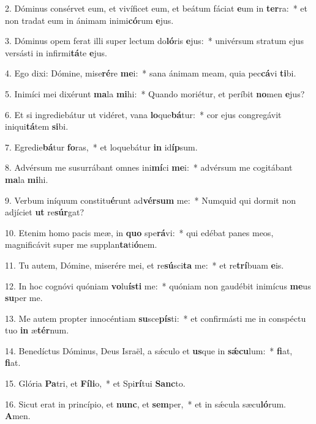 2. Dóminus consérvet eum, et vivíficet eum, et beátum fáciat \textbf{e}um in \textbf{ter}ra:~*  et non tradat eum in ánimam inimi\textbf{có}rum \textbf{e}jus.\

3. Dóminus opem ferat illi super lectum do\textbf{ló}ris \textbf{e}jus:~*  univérsum stratum ejus versásti in infirmi\textbf{tá}te \textbf{e}jus.\

4. Ego dixi: Dómine, mise\textbf{ré}re \textbf{me}i:~*  sana ánimam meam, quia pec\textbf{cá}vi \textbf{ti}bi.\

5. Inimíci mei dixérunt \textbf{ma}la \textbf{mi}hi:~*  Quando moriétur, et períbit \textbf{no}men \textbf{e}jus?\

6. Et si ingrediebátur ut vidéret, vana \textbf{lo}que\textbf{bá}tur:~*  cor ejus congregávit iniqui\textbf{tá}tem \textbf{si}bi.\

7. Egredie\textbf{bá}tur \textbf{fo}ras,~*  et loquebátur \textbf{in} id\textbf{íp}sum.\

8. Advérsum me susurrábant omnes ini\textbf{mí}ci \textbf{me}i:~*  advérsum me cogitábant \textbf{ma}la \textbf{mi}hi.\

9. Verbum iníquum constitu\textbf{é}runt ad\textbf{vér}\textbf{sum} me:~*  Numquid qui dormit non adjíciet \textbf{ut} re\textbf{súr}gat?\

10. Etenim homo pacis meæ, in \textbf{quo} spe\textbf{rá}vi:~*  qui edébat panes meos, magnificávit super me supplan\textbf{ta}ti\textbf{ó}nem.\

11. Tu autem, Dómine, miserére mei, et re\textbf{sú}sci\textbf{ta} me:~*  et re\textbf{trí}buam \textbf{e}is.\

12. In hoc cognóvi quóniam \textbf{vo}lu\textbf{ís}\textbf{ti} me:~*  quóniam non gaudébit inimícus \textbf{me}us \textbf{su}per me.\

13. Me autem propter innocéntiam \textbf{su}sce\textbf{pís}ti:~*  et confirmásti me in conspéctu tuo \textbf{in} æ\textbf{tér}num.\

14. Benedíctus Dóminus, Deus Israël, a sǽculo et \textbf{us}que in \textbf{sǽ}\textbf{cu}lum:~*  \textbf{fi}at, \textbf{fi}at.\

15. Glória \textbf{Pa}tri, et \textbf{Fí}\textbf{li}o,~*  et Spi\textbf{rí}tui \textbf{Sanc}to.\

16. Sicut erat in princípio, et \textbf{nunc}, et \textbf{sem}per,~*  et in sǽcula sæcu\textbf{ló}rum. \textbf{A}men.\

